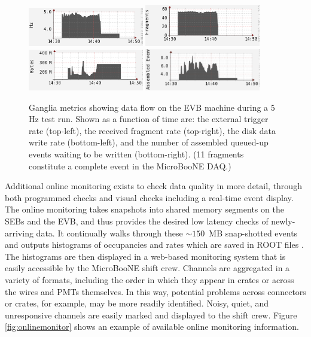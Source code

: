 \begin{figure}
\centering
\includegraphics[width=0.45\textwidth]{./figures/ganglia_EXT_trigRate.png}
\includegraphics[width=0.45\textwidth]{./figures/ganglia_RECEIVEDfrag_rate.png}\\
\includegraphics[width=0.45\textwidth]{./figures/ganglia_WRITEdata_rate.png}
\includegraphics[width=0.45\textwidth]{./figures/ganglia_WRITEQUE_size.png}
\caption{Ganglia metrics showing data flow on the EVB machine during a 5 Hz test run. Shown as a function of time are: the external trigger rate (top-left), the received fragment rate (top-right), the disk data write rate (bottom-left), and the number of assembled queued-up events waiting to be written (bottom-right). (11 fragments constitute a complete event in the MicroBooNE DAQ.)}
\label{fig:ganglia}
\end{figure}

Additional online monitoring exists to check data quality in more detail, through both programmed checks and visual checks including a real-time event display. The online monitoring takes snapshots into shared memory segments on the SEBs and the EVB, and thus provides the desired low latency checks of newly-arriving data. It continually walks through these $\sim150$~MB snap-shotted events and outputs histograms of occupancies and rates which are saved in ROOT files \cite{BRUN199781}. The histograms are then displayed in a web-based monitoring system that is easily accessible by the MicroBooNE shift crew. Channels are aggregated in a variety of formats, including the order in which they appear in crates or across the wires and PMTs themselves. In this way, potential problems across connectors or crates, for example, may be more readily identified. Noisy, quiet, and unresponsive channels are easily marked and displayed to the shift crew.  Figure \ref{fig:onlinemonitor} shows an example of available online monitoring information.

